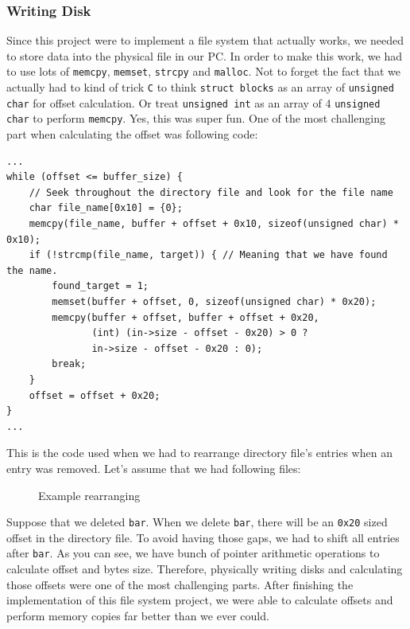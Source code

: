 \documentclass{homework}
\begin{document}
\subsubsection{Writing Disk}
Since this project were to implement a file system that actually works, we needed to store data into the physical file in our PC. In order to make this work, we had to use lots of \texttt{memcpy}, \texttt{memset}, \texttt{strcpy} and \texttt{malloc}. Not to forget the fact that we actually had to kind of  trick \texttt{C} to think \texttt{struct blocks} as an array of \texttt{unsigned char} for offset calculation. Or treat \texttt{unsigned int} as an array of 4 \texttt{unsigned char} to perform \texttt{memcpy}. Yes, this was super fun. One of the most challenging part when calculating the offset was following code:
\\
\begin{center}
\begin{code}
\begin{verbatim}
...
while (offset <= buffer_size) {
    // Seek throughout the directory file and look for the file name
    char file_name[0x10] = {0};
    memcpy(file_name, buffer + offset + 0x10, sizeof(unsigned char) * 0x10);
    if (!strcmp(file_name, target)) { // Meaning that we have found the name.
        found_target = 1;
        memset(buffer + offset, 0, sizeof(unsigned char) * 0x20); 
        memcpy(buffer + offset, buffer + offset + 0x20, 
               (int) (in->size - offset - 0x20) > 0 ? 
               in->size - offset - 0x20 : 0); 
        break;
    }
    offset = offset + 0x20;
}
...
\end{verbatim}
\end{code}
\end{center}

This is the code used when we had to rearrange directory file's entries when an entry was removed. Let's assume that we had following files:

\begin{figure}[h]
\begin{center}
\begin{minipage}{7cm}
\end{minipage}
\end{center}
\caption{Example rearranging}
\end{figure}
Suppose that we deleted \texttt{bar}. When we delete \texttt{bar}, there will be an \texttt{0x20} sized offset in the directory file. To avoid having those gaps, we had to shift all entries after \texttt{bar}. As you can see, we have bunch of pointer arithmetic operations to calculate offset and bytes size. Therefore, physically writing disks and calculating those offsets were one of the most challenging parts. After finishing the implementation of this file system project, we were able to calculate offsets and perform memory copies far better than we ever could.
\end{document}
